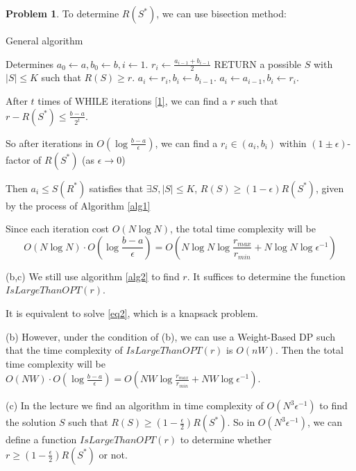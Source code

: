 \documentclass[a4paper]{article}
\theoremstyle{definition}
\newtheorem{problem}{Problem}
\theoremstyle{plain}
\newcommand{\dps}{\displaystyle}
\numberwithin{equation}{problem}
\begin{document}
\begin{problem}
    To determine  $ R(S^*) $, we can use bisection method:
    
    \begin{algorithm}
        \caption{General algorithm}
        \label{alg2}
        \begin{algorithmic}[1]
            \STATE Determines  $ a_0\leftarrow a,b_0\leftarrow b,i\leftarrow 1 $.
            \WHILE{}\label{1}
                \STATE  $ r_i\leftarrow \frac{a_{i-1}+b_{i-1}}{2} $
                    \STATE RETURN a possible  $ S $ with  $ |S| \leq K $ such that  $ R(S) \geq r $.
                    \STATE  $ a_i\leftarrow r_i,b_i\leftarrow b_{i-1} $.
                    \STATE  $ a_i\leftarrow a_{i-1},b_i\leftarrow r_i $.
                \ENDIF
            \ENDWHILE 
        \end{algorithmic}
    \end{algorithm}
    After  $ t $ times of  WHILE iterations \ref{1}, we can find a  $ r $ such that  $\dps r-R(S^*) \leq \frac{b-a}{2^t} $.
    
    So after iterations in  $ O(\log \frac{b-a}{\epsilon}) $, we can find a  $ r_i\in (a_i,b_i) $ within  $ (1\pm \epsilon) $-factor of  $ R(S^*) $ (as  $ \epsilon\rightarrow 0 $) 

    Then  $ a_i \leq S(R^*) $ satisfies that  $ \exists S, |S| \leq K $,  $ R(S) \geq (1-\epsilon)R(S^*) $, given by the process of Algorithm \ref{alg1}
    
    Since each iteration cost  $ O(N\log N) $, the total time complexity will be 
    \[O(N\log N)\cdot O(\log\frac{b-a}{\epsilon})=O(N\log N\log\frac{r_{max}}{r_{min}}+N\log N\log\epsilon^{-1})\] 

    (b,c) We still use  algorithm \ref{alg2} to find  $ r $. It suffices to determine the function  $ IsLargeThanOPT(r)   $.
      
    It is equivalent to solve \eqref{eq2}, which  is a knapsack problem. 
    
    (b) However, under the condition of (b), we can use  a Weight-Based DP such that the time  complexity of  $ IsLargeThanOPT(r) $ is  $ O(nW) $. Then  the total time complexity will be  $ O(NW)\cdot O(\log\frac{b-a}{\epsilon})=O(NW\log\frac{r_{max}}{r_{min}}+NW\log\epsilon^{-1}) $.  

    (c) In the lecture we find an algorithm in time complexity of  $ O(N^3\epsilon^{-1}) $ to find the solution  $ S $ such that  $ R(S) \geq (1-\frac{\epsilon}{2})R(S^*) $. So in  $ O(N^3\epsilon^{-1}) $, we can define a function  $ IsLargeThanOPT(r) $ to determine whether  $ r \geq (1-\frac{\epsilon}{2})R(S^*) $ or not.   
    

\end{problem}
\end{document}
